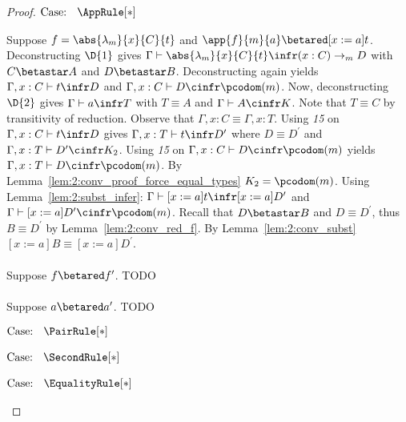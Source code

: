 \begin{proof}
    $\text{Case: }\begin{array}{c} \AppRule[*] \end{array}$
    \begin{proofcase}
        Suppose $f = \abs{\lambda_m}{x}{C}{t}$ and $\app{f}{m}{a} \betared [x := a]t$.
        Deconstructing $\D{1}$ gives $\Gamma \vdash \abs{\lambda_m}{x}{C}{t} \infr (x : C) \to_m D$ with $C \betastar A$ and $D \betastar B$.
        Deconstructing again yields $\Gamma, x : C \vdash t \infr D$ and $\Gamma, x : C \vdash D \cinfr \pcodom(m)$.
        Now, deconstructing $\D{2}$ gives $\Gamma \vdash a \infr T$ with $T \equiv A$ and $\Gamma \vdash A \cinfr K$.
        Note that $T \equiv C$ by transitivity of reduction.
        Observe that $\Gamma, x : C \equiv \Gamma, x : T$.
        Using \textit{15} on $\Gamma, x : C \vdash t \infr D$ gives $\Gamma, x : T \vdash t \infr D^\prime$ where $D \equiv D^\prime$ and $\Gamma, x : T \vdash D^\prime \cinfr K_2$.
        Using \textit{15} on $\Gamma, x : C \vdash D \cinfr \pcodom(m)$ yields $\Gamma, x : T \vdash D \cinfr \pcodom(m)$.
        By Lemma~\ref{lem:2:conv_proof_force_equal_types} $K_2 = \pcodom(m)$.
        Using Lemma~\ref{lem:2:subst_infer}: $\Gamma \vdash [x := a]t \infr [x := a]D^\prime$ and $\Gamma \vdash [x := a]D^\prime \cinfr \pcodom(m)$.
        Recall that $D \betastar B$ and $D \equiv D^\prime$, thus $B \equiv D^\prime$ by Lemma~\ref{lem:2:conv_red_f}.
        By Lemma~\ref{lem:2:conv_subst} $[x := a]B \equiv [x := a]D^\prime$.
        \\ \\
        Suppose $f \betared f^\prime$.
        TODO
        \\ \\
        Suppose $a \betared a^\prime$.
        TODO
    \end{proofcase}

    $\text{Case: }\begin{array}{c} \PairRule[*] \end{array}$
    \begin{proofcase}
    \end{proofcase}

    $\text{Case: }\begin{array}{c} \SecondRule[*] \end{array}$
    \begin{proofcase}
    \end{proofcase}

    $\text{Case: }\begin{array}{c} \EqualityRule[*] \end{array}$
    \begin{proofcase}
    \end{proofcase}


\end{proof}
